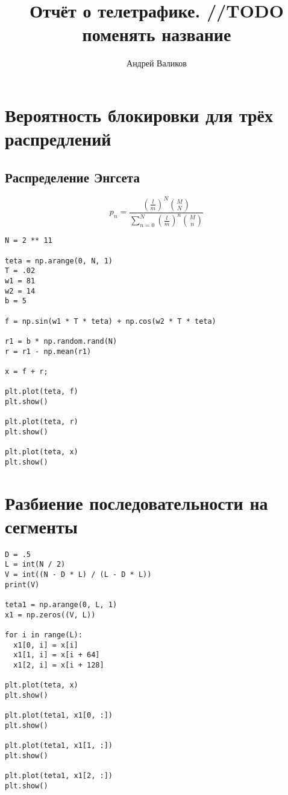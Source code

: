 \documentclass[12pt]{article}
\begin{document}
\title{Отчёт о телетрафике. //TODO поменять название}
\author{Андрей Валиков}
\date{}
\maketitle
																																																							

\section{Вероятность блокировки для трёх распредлений}

\subsection{Распределение Энгсета}


\[p_n = \frac{\left(\frac{l}{m}\right) ^ N \binom{M}{N}}
{\sum_{n=0}^{N} \left(\frac{l}{m}\right) ^ n \binom{M}{n}} \]


\begin{lstlisting}
N = 2 ** 11

teta = np.arange(0, N, 1)
T = .02
w1 = 81
w2 = 14
b = 5

f = np.sin(w1 * T * teta) + np.cos(w2 * T * teta)

r1 = b * np.random.rand(N)
r = r1 - np.mean(r1)

x = f + r;

plt.plot(teta, f)
plt.show()

plt.plot(teta, r)
plt.show()

plt.plot(teta, x)
plt.show()
\end{lstlisting}




\section{Разбиение последовательности на сегменты}




\begin{lstlisting}
D = .5
L = int(N / 2)
V = int((N - D * L) / (L - D * L))
print(V)

teta1 = np.arange(0, L, 1)
x1 = np.zeros((V, L))

for i in range(L):
  x1[0, i] = x[i]
  x1[1, i] = x[i + 64]
  x1[2, i] = x[i + 128]

plt.plot(teta, x)
plt.show()

plt.plot(teta1, x1[0, :])
plt.show()

plt.plot(teta1, x1[1, :])
plt.show()

plt.plot(teta1, x1[2, :])
plt.show()
\end{lstlisting}
\end{document}
